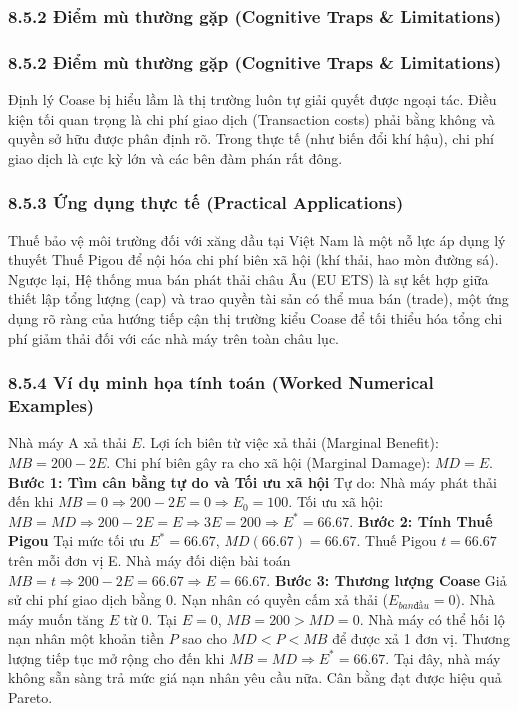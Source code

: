 \documentclass[
]{article}
\begin{document}
\subsubsection{8.5.2 Điểm mù thường gặp (Cognitive Traps \&
Limitations)}\label{ux111iux1ec3m-muxf9-thux1b0ux1eddng-gux1eb7p-cognitive-traps-limitations-61}

\subsubsection{8.5.2 Điểm mù thường gặp (Cognitive Traps \&
Limitations)}\label{ux111iux1ec3m-muxf9-thux1b0ux1eddng-gux1eb7p-cognitive-traps-limitations-62}

Định lý Coase bị hiểu lầm là thị trường luôn tự giải quyết được ngoại
tác. Điều kiện tối quan trọng là chi phí giao dịch (Transaction costs)
phải bằng không và quyền sở hữu được phân định rõ. Trong thực tế (như
biến đổi khí hậu), chi phí giao dịch là cực kỳ lớn và các bên đàm phán
rất đông.

\subsubsection{8.5.3 Ứng dụng thực tế (Practical
Applications)}\label{ux1ee9ng-dux1ee5ng-thux1ef1c-tux1ebf-practical-applications-30}

Thuế bảo vệ môi trường đối với xăng dầu tại Việt Nam là một nỗ lực áp
dụng lý thuyết Thuế Pigou để nội hóa chi phí biên xã hội (khí thải, hao
mòn đường sá). Ngược lại, Hệ thống mua bán phát thải châu Âu (EU ETS) là
sự kết hợp giữa thiết lập tổng lượng (cap) và trao quyền tài sản có thể
mua bán (trade), một ứng dụng rõ ràng của hướng tiếp cận thị trường kiểu
Coase để tối thiểu hóa tổng chi phí giảm thải đối với các nhà máy trên
toàn châu lục.

\subsubsection{8.5.4 Ví dụ minh họa tính toán (Worked Numerical
Examples)}\label{vuxed-dux1ee5-minh-hux1ecda-tuxednh-touxe1n-worked-numerical-examples-29}

Nhà máy A xả thải \(E\). Lợi ích biên từ việc xả thải (Marginal
Benefit): \(MB = 200 - 2E\). Chi phí biên gây ra cho xã hội (Marginal
Damage): \(MD = E\). \textbf{Bước 1: Tìm cân bằng tự do và Tối ưu xã
hội} Tự do: Nhà máy phát thải đến khi
\(MB = 0 \Rightarrow 200 - 2E = 0 \Rightarrow E_0 = 100\). Tối ưu xã
hội:
\(MB = MD \Rightarrow 200 - 2E = E \Rightarrow 3E = 200 \Rightarrow E^* = 66.67\).
\textbf{Bước 2: Tính Thuế Pigou} Tại mức tối ưu \(E^* = 66.67\),
\(MD(66.67) = 66.67\). Thuế Pigou \(t = 66.67\) trên mỗi đơn vị E. Nhà
máy đối diện bài toán
\(MB = t \Rightarrow 200 - 2E = 66.67 \Rightarrow E = 66.67\).
\textbf{Bước 3: Thương lượng Coase} Giả sử chi phí giao dịch bằng 0. Nạn
nhân có quyền cấm xả thải (\(E_{ban đầu} = 0\)). Nhà máy muốn tăng \(E\)
từ 0. Tại \(E=0\), \(MB=200 > MD=0\). Nhà máy có thể hối lộ nạn nhân một
khoản tiền \(P\) sao cho \(MD < P < MB\) để được xả 1 đơn vị. Thương
lượng tiếp tục mở rộng cho đến khi \(MB = MD \Rightarrow E^* = 66.67\).
Tại đây, nhà máy không sẵn sàng trả mức giá nạn nhân yêu cầu nữa. Cân
bằng đạt được hiệu quả Pareto.
\end{document}
